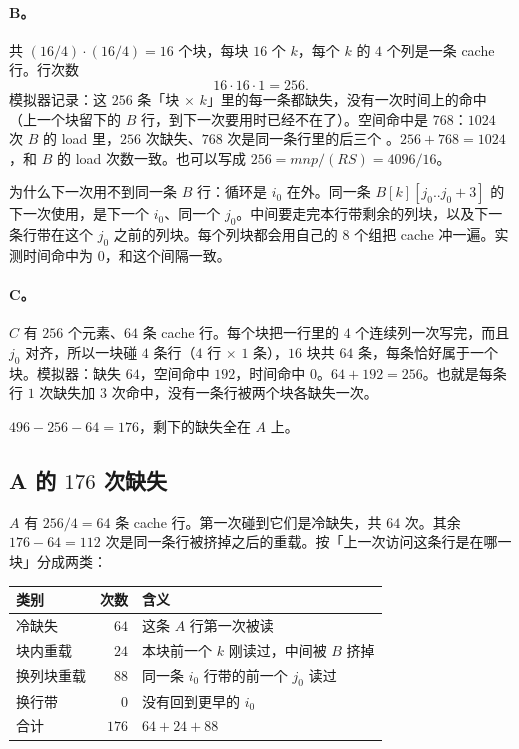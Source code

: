 \paragraph{B。}
共 $(16/4)\cdot(16/4)=16$ 个块，每块 $16$ 个 $k$，每个 $k$ 的 $4$ 个列是一条 cache 行。行次数
\[
16\cdot16\cdot1=256.
\]
模拟器记录：这 $256$ 条「块 $\times$ $k$」里的每一条都缺失，没有一次时间上的命中（上一个块留下的 $B$ 行，到下一次要用时已经不在了）。空间命中是 $768$：$1024$ 次 $B$ 的 load 里，$256$ 次缺失、$768$ 次是同一条行里的后三个 。$256+768=1024$，和 $B$ 的 load 次数一致。也可以写成 $256=mnp/(RS)=4096/16$。

为什么下一次用不到同一条 $B$ 行：循环是 $i_0$ 在外。同一条 $B[k][j_0..j_0+3]$ 的下一次使用，是下一个 $i_0$、同一个 $j_0$。中间要走完本行带剩余的列块，以及下一条行带在这个 $j_0$ 之前的列块。每个列块都会用自己的 $8$ 个组把 cache 冲一遍。实测时间命中为 $0$，和这个间隔一致。

\paragraph{C。}
$C$ 有 $256$ 个元素、$64$ 条 cache 行。每个块把一行里的 $4$ 个连续列一次写完，而且 $j_0$ 对齐，所以一块碰 $4$ 条行（$4$ 行 $\times$ $1$ 条），$16$ 块共 $64$ 条，每条恰好属于一个块。模拟器：缺失 $64$，空间命中 $192$，时间命中 $0$。$64+192=256$。也就是每条行 $1$ 次缺失加 $3$ 次命中，没有一条行被两个块各缺失一次。

$496-256-64=176$，剩下的缺失全在 $A$ 上。

\subsection{A 的 \texorpdfstring{$176$}{176} 次缺失}

$A$ 有 $256/4=64$ 条 cache 行。第一次碰到它们是冷缺失，共 $64$ 次。其余 $176-64=112$ 次是同一条行被挤掉之后的重载。按「上一次访问这条行是在哪一块」分成两类：

\begin{center}
\begin{tabular}{@{}lrl@{}}
\toprule
类别 & 次数 & 含义\\
\midrule
冷缺失 & $64$ & 这条 $A$ 行第一次被读\\
块内重载 & $24$ & 本块前一个 $k$ 刚读过，中间被 $B$ 挤掉\\
换列块重载 & $88$ & 同一条 $i_0$ 行带的前一个 $j_0$ 读过\\
换行带 & $0$ & 没有回到更早的 $i_0$\\
\midrule
合计 & $176$ & $64+24+88$\\
\bottomrule
\end{tabular}
\end{center}


